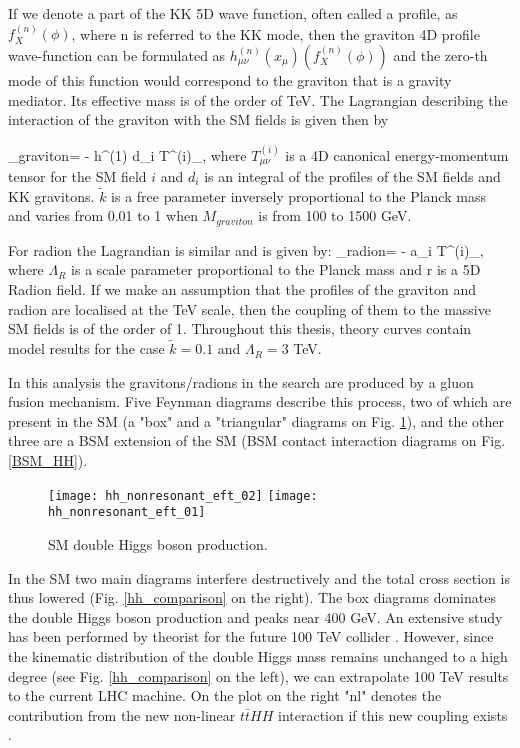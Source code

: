 If we denote a part of the KK 5D wave function, often called a profile, as $f^{(n)}_X(\phi)$, where n is referred to the KK mode, then the graviton 4D profile wave-function can be formulated as $h^{(n)}_{\mu\nu}(x_\mu)(f^{(n)}_X(\phi))$ and the zero-th mode of this function would correspond to the graviton that is a gravity mediator. Its effective mass is of the order of TeV. The Lagrangian describing the interaction of the graviton with the SM fields is given then by 

\beqn\label{lagr_Yuk}
\Lagr_{graviton}=  -  h^{\mu\nu(1)} \times d_i T^{(i)}_{\mu\nu},  
\eeqn
where $T^{(i)}_{\mu\nu}$ is a 4D canonical energy-momentum tensor \cite{Forger:2003ut} for the SM field $i$ and $d_i$ is an integral of the profiles of the SM fields and KK gravitons. $\tilde{k}$ is a free parameter inversely proportional to the Planck mass and varies from 0.01 to 1 when $M_{graviton}$ is from 100 to 1500 GeV. 

For radion the Lagrandian is similar and is given by:
\beqn\label{lagr_Yuk}
\Lagr_{radion}=  -  \times a_i T^{\mu (i)}_{\mu},  
\eeqn
where $\Lambda_R$ is a scale parameter proportional to the Planck mass and r is a 5D Radion field. If we make an assumption that the profiles of the graviton and radion are localised at the TeV scale, then the coupling of them to the massive SM fields is of the order of 1. Throughout this thesis, theory curves contain model results for the case $\tilde{k}=0.1$ and $\Lambda_R = 3 $ TeV.  

In this analysis the gravitons/radions in the search are produced by a gluon fusion mechanism. Five Feynman diagrams describe this process, two of which are present in the SM (a "box" and a "triangular" diagrams on Fig. \ref{SM_HH}), and the other three are a BSM extension of the SM (BSM contact interaction diagrams on Fig. \ref{BSM_HH}).   



\begin{figure}[H]
  \centering
    \texttt{[image: hh\_nonresonant\_eft\_02]}
     \texttt{[image: hh\_nonresonant\_eft\_01]}
    \caption{SM double Higgs boson production.}
    \label{SM_HH}
\end{figure}

In the SM two main diagrams interfere destructively and the total cross section is thus lowered (Fig. \ref{hh_comparison} on the right). The box diagrams dominates the double Higgs boson production and peaks near 400 GeV. An extensive study has been performed by theorist for the future 100 TeV collider \cite{Chen:2014xra,}. However, since the kinematic distribution of the double Higgs mass remains unchanged to a high degree (see Fig. \ref{hh_comparison} on the left), we can extrapolate 100 TeV results to the current LHC machine. On the plot on the right "nl" denotes the contribution from the new non-linear $t\bar{t}HH$ interaction if this new coupling exists \cite{Contino:2012xk}. 


